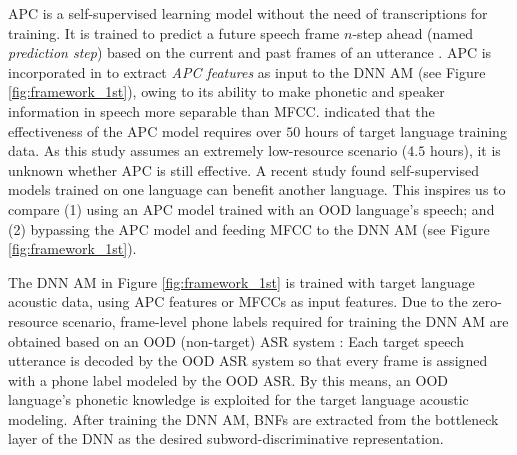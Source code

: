 \documentclass[a4paper]{article}
\begin{document}
APC is a self-supervised learning model without the need of transcriptions for training. It is 
trained to predict a future speech frame $n$-step ahead (named \textit{prediction step}) based on the current and past frames of an utterance \cite{Chung2019}. APC is incorporated in \cite{feng2020unsupervised} to extract \textit{APC features} as input to the DNN AM (see Figure \ref{fig:framework_1st}), owing to its ability to make phonetic and speaker information   in speech   more separable than  MFCC.   \cite{feng2020unsupervised} indicated that the effectiveness of the APC model requires over $50$ hours of target language training data. As this study assumes  an extremely low-resource scenario ($4.5$ hours), it is unknown whether APC is still effective. 
A recent study \cite{riviere2020unsupervised} found self-supervised models trained on one language   can benefit another language. This  inspires us to compare (1)  using an APC model trained with an OOD language's speech; and (2) bypassing the APC model and feeding MFCC  to the DNN AM (see Figure \ref{fig:framework_1st}). 

The  DNN AM in Figure \ref{fig:framework_1st}
is trained with target language acoustic data, using APC features or MFCCs as input features.
Due to the zero-resource scenario, frame-level phone labels required for training the DNN AM are obtained based on an OOD (non-target)  ASR system  \cite{feng2020unsupervised}: Each  target speech utterance is decoded by the OOD ASR system so that every frame is assigned with a  phone label modeled by the OOD ASR. 
By this means, an OOD language's phonetic knowledge is exploited for the target language acoustic modeling.
After training the DNN AM, BNFs are extracted from the bottleneck layer of the DNN as the desired subword-discriminative representation.
\end{document}
